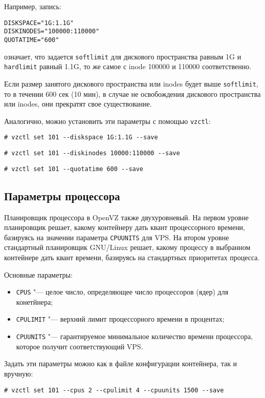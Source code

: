 Например, запись:
\begin{lstlisting}
DISKSPACE="1G:1.1G"
DISKINODES="100000:110000"
QUOTATIME="600" 
\end{lstlisting}
означает, что задается \texttt{softlimit} для дискового пространства равным 1G и \texttt{hardlimit} равный 1.1G, то же самое с inode 100000 и 110000 соответственно.

Если размер занятого дискового пространства или inodes будет выше \texttt{softlimit}, то в течении 600 сек (10 мин), в случае не освобождения дискового пространства или inodes, они прекратят свое существование.

Аналогично, можно установить эти параметры с помощью \texttt{vzctl}:
\begin{lstlisting}
# vzctl set 101 --diskspace 1G:1.1G --save
\end{lstlisting}
\begin{lstlisting}
# vzctl set 101 --diskinodes 10000:110000 --save
\end{lstlisting}
\begin{lstlisting}
# vzctl set 101 --quotatime 600 --save
\end{lstlisting}

\subsection{Параметры процессора}
Планировщик процессора в OpenVZ также двухуровневый. 
На первом уровне планировщик решает, какому контейнеру дать квант процессорного времени, базируясь на значении параметра \texttt{CPUUNITS} для VPS. 
На втором уровне стандартный планировщик GNU/Linux решает, какому процессу в выбранном контейнере дать квант времени, базируясь на стандартных приоритетах процесса.

Основные параметры:
\begin{itemize}
    \item \texttt{CPUS} "--- целое число, определяющее число процессоров (ядер) для конетйнера;
    \item \texttt{CPULIMIT} "--- верхний лимит процессорного времени в процентах;
    \item \texttt{CPUUNITS} "--- гарантируемое минимальное количество времени процессора, которое получит соответствующий VPS.
\end{itemize}

Задать эти параметры можно как в файле конфигурации контейнера, так и вручную:
\begin{lstlisting}
# vzctl set 101 --cpus 2 --cpulimit 4 --cpuunits 1500 --save
\end{lstlisting}

